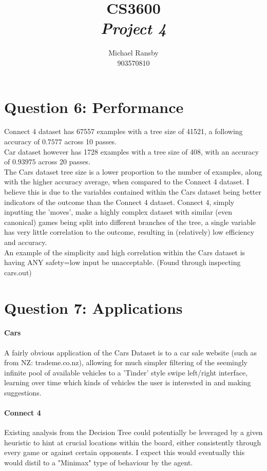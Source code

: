 \documentclass[10pt,a4paper,titlepage]{article}
\author{Michael Ransby\\903570810}
\title{CS3600\\\textit{Project 4}}
\begin{document}
\maketitle
\section{Question 6: Performance}
Connect 4 dataset has 67557 examples with a tree size of 41521, a following accuracy of $0.7577$ across 10 passes.\\
Car dataset however has 1728 examples with a tree size of 408, with an accuracy of $0.93975$ across 20 passes.\\
The Cars dataset tree size is a lower proportion to the number of examples, along with the higher accuracy average, when compared to the Connect 4 dataset. I believe this is due to the variables contained within the Cars dataset being better indicators of the outcome than the Connect 4 dataset. Connect 4, simply inputting the 'moves', make a highly complex dataset with similar (even canonical) games being split into different branches of the tree, a single variable has very little correlation to the outcome, resulting in (relatively) low efficiency and accuracy. \\ An example of the simplicity and high correlation within the Cars dataset is having ANY safety=low input be unacceptable. (Found through inspecting cars.out)

\section{Question 7: Applications}
\paragraph{Cars}
A fairly obvious application of the Cars Dataset is to a car sale website (such as from NZ: trademe.co.nz), allowing for much simpler filtering of the seemingly infinite pool of available vehicles to a 'Tinder' style swipe left/right interface, learning over time which kinds of vehicles the user is interested in and making suggestions.

\paragraph{Connect 4}
Existing analysis from the Decision Tree could potentially be leveraged by a given heuristic to hint at crucial locations within the board, either consistently through every game or against certain opponents. I expect this would eventually this would distil to a "Minimax" type of behaviour by the agent.
\end{document}
